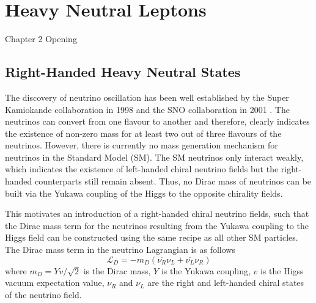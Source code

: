 
\chapter{Heavy Neutral Leptons}

\ifpdf
    \graphicspath{{Chapter2/Figs/Raster/}{Chapter2/Figs/PDF/}{Chapter2/Figs/}}
\else
    \graphicspath{{Chapter2/Figs/Vector/}{Chapter2/Figs/}}
\fi


Chapter 2 Opening

\newpage
\section{Right-Handed Heavy Neutral States}

The discovery of neutrino oscillation has been well established by the Super Kamiokande collaboration in 1998 \cite{superK} and the SNO collaboration in 2001 \cite{SNO}. 
The neutrinos can convert from one flavour to another and therefore, clearly indicates the existence of non-zero mass for at least two out of three flavours of the neutrinos.
However, there is currently no mass generation mechanism for neutrinos in the Standard Model (SM).
The SM neutrinos only interact weakly, which indicates the existence of left-handed chiral neutrino fields but the right-handed counterparts still remain absent.
Thus, no Dirac mass of neutrinos can be built via the Yukawa coupling of the Higgs to the opposite chirality fields. 

This motivates an introduction of a right-handed chiral neutrino fields, such that the Dirac mass term for the neutrinos resulting from the Yukawa coupling to the Higgs field can be constructed using the same recipe as all other SM particles.
The Dirac mass term in the neutrino Lagrangian is as follows \cite{Thomson}
\begin{equation}
\mathcal{L}_{D} = -m_{D} (\overline{\nu_{R}}\nu_{L} + \overline{\nu_{L}}\nu_{R}) 
\label{eq:dirac}
\end{equation}
where $m_{D} = Yv/\sqrt{2}$ is the Dirac mass, $Y$ is the Yukawa coupling, $v$ is the Higss vacuum expectation value, $\nu_{R}$ and $\nu_{L}$ are the right and left-handed chiral states of the neutrino field.

